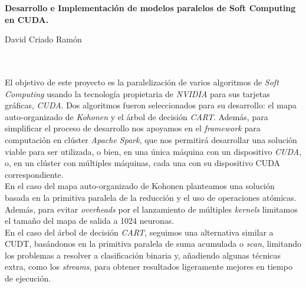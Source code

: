 

%



\cleardoublepage
\thispagestyle{empty}

\begin{center}
{\large\bfseries Desarrollo e Implementación de modelos paralelos de Soft Computing en CUDA.}\\
\end{center}
\begin{center}
David Criado Ramón\\
\end{center}

\\

\vspace{0.7cm}
\\

El objetivo de este proyecto es la paralelización de varios algoritmos de \textit{Soft Computing} usando la tecnología propietaria de \textit{NVIDIA} para sus tarjetas gráficas, \textit{CUDA}. Dos algoritmos fueron seleccionados para su desarrollo: el mapa auto-organizado de \textit{Kohonen} y el árbol de decisión \textit{CART}. Además, para simplificar el proceso de desarrollo nos apoyamos en el \textit{framework} para computación en clúster \textit{Apache Spark}, que nos permitirá desarrollar una solución viable para ser utilizada, o bien, en una única máquina con un dispositivo \textit{CUDA}, o, en un clúster con múltiples máquinas, cada una con su dispositivo CUDA correspondiente.\\

En el caso del mapa auto-organizado de Kohonen planteamos una solución basada en la primitiva paralela de la reducción y el uso de operaciones atómicas. Además, para evitar \textit{overheads} por el lanzamiento de múltiples \textit{kernels} limitamos el tamaño del mapa de salida a 1024 neuronas. \\

En el caso del árbol de decisión \textit{CART}, seguimos una alternativa similar a CUDT, basándonos en la primitiva paralela de suma acumulada o \textit{scan}, limitando los problemas a resolver a clasificación binaria y, añadiendo algunas técnicas extra, como los \textit{streams}, para obtener resultados ligeramente mejores en tiempo de ejecución. \\

